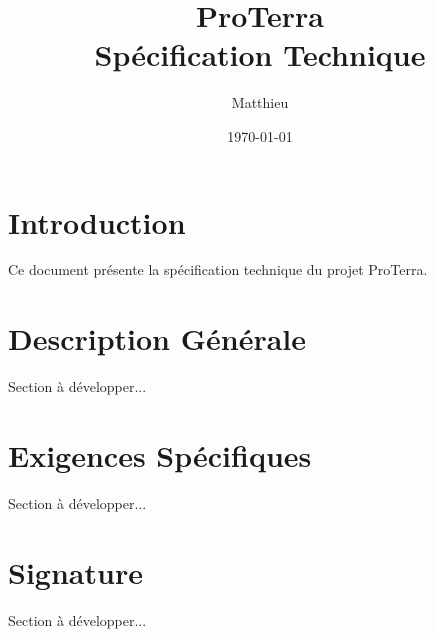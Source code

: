 \documentclass[12pt,a4paper]{article}
\title{ProTerra\\Spécification Technique}
\author{Matthieu}
\date{\today}
\begin{document}
\maketitle
\newpage

\vspace*{5cm} %
\tableofcontents
\newpage
\hspace{2cm}
\section{Introduction}
Ce document présente la spécification technique du projet ProTerra.

% 
% 
% 
% 

\section{Description Générale}
Section à développer...

\section{Exigences Spécifiques}
Section à développer...

\section{Signature}
Section à développer...
\end{document}
